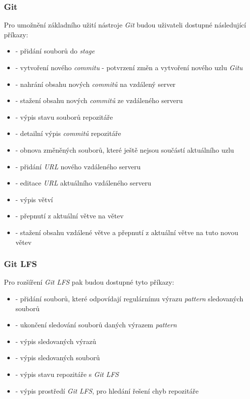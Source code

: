         \subsubsection{Git}
        Pro umožnění základního užití nástroje \emph{Git} budou uživateli dostupné následující příkazy:
        \begin{itemize}
            \item \textbf{} - přidání souborů do \emph{stage}
            \item \textbf{} - vytvoření nového \emph{commitu} - potvrzení změn a vytvoření nového uzlu \emph{Gitu}
            \item \textbf{} - nahrání obsahu nových \emph{commitů} na vzdálený server
            \item \textbf{} - stažení obsahu nových \emph{commitů} ze vzdáleného serveru
            \item \textbf{} - výpis stavu souborů repozitáře
            \item \textbf{} - detailní výpis \emph{commitů} repozitáře
            \item \textbf{} - obnova změněných souborů, které ještě nejsou součástí aktuálního uzlu
            \item \textbf{} - přidání \emph{URL} nového vzdáleného serveru
            \item \textbf{} - editace \emph{URL} aktuálního vzdáleného serveru
            \item \textbf{} - výpis větví
            \item \textbf{} - přepnutí z aktuální větve na větev 
            \item \textbf{} - stažení obsahu vzdálené větve a přepnutí z aktuální větve na tuto novou větev
        \end{itemize}

        \subsubsection{Git LFS}
        Pro rozšíření \emph{Git LFS} pak budou dostupné tyto příkazy:
        \begin{itemize}
            \item \textbf{} - přidání souborů, které odpovídají regulárnímu výrazu \emph{pattern} sledovaných souborů
            \item \textbf{} - ukončení sledování souborů daných výrazem \emph{pattern}
            \item \textbf{} - výpis sledovaných výrazů
            \item \textbf{} - výpis sledovaných souborů 
            \item \textbf{} - výpis stavu repozitáře s \emph{Git LFS}
            \item \textbf{} - výpis prostředí \emph{Git LFS}, pro hledání řešení chyb repozitáře
        \end{itemize}
    
